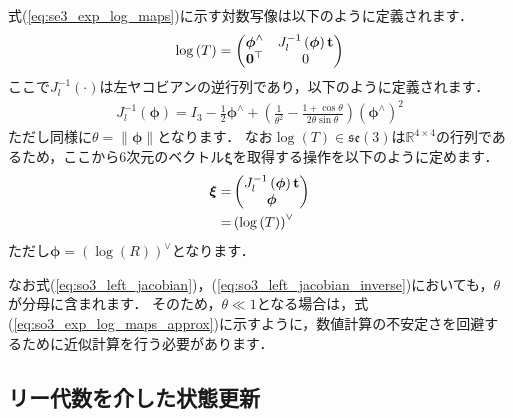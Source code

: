 式(\ref{eq:se3_exp_log_maps})に示す対数写像は以下のように定義されます．
%
\begin{align}
  \log \left( T \right) = \left( \begin{matrix}
    \boldsymbol \phi^{\wedge} & J_{l}^{-1} \left( \boldsymbol \phi \right) {\bf t} \\
    {\bf 0}^{\top}            & 0
  \end{matrix} \right)
  \label{eq:se3_log_map}
\end{align}
%
ここで$J_{l}^{-1} \left( \cdot \right)$は左ヤコビアンの逆行列であり，以下のように定義されます．
%
\begin{align}
  J_{l}^{-1} \left( \boldsymbol \phi \right)
  =
  I_{3} -
  \frac{1}{2} \boldsymbol \phi^{\wedge} + 
  \left( \frac{1}{ \theta^{2} } - \frac{ 1 + \cos \theta }{ 2 \theta \sin \theta } \right) \left( \boldsymbol \phi^{\wedge} \right)^{2}
  \label{eq:so3_left_jacobian_inverse}
\end{align}
%
ただし同様に$\theta = \| \boldsymbol \phi \|$となります．
なお$\log \left( T \right) \in \mathfrak{se}(3)$は$\mathbb{R}^{4 \times 4}$の行列であるため，ここから6次元のベクトル$\boldsymbol \xi$を取得する操作を以下のように定めます．
%
\begin{align}
  \begin{split}
    \boldsymbol \xi
%
    = & \left( \begin{matrix}
      J_{l}^{-1} \left( \boldsymbol \phi \right) {\bf t} \\
      \boldsymbol \phi
    \end{matrix} \right) \\
%
    = & \left( \log \left( T \right) \right)^{\vee}
  \end{split}
\end{align}
%
ただし$\boldsymbol \phi = \left( \log \left( R \right) \right)^{\vee}$となります．

なお式(\ref{eq:so3_left_jacobian})，(\ref{eq:so3_left_jacobian_inverse})においても，$\theta$が分母に含まれます．
そのため，$\theta \ll 1$となる場合は，式(\ref{eq:so3_exp_log_maps_approx})に示すように，数値計算の不安定さを回避するために近似計算を行う必要があります．











\subsection{リー代数を介した状態更新}

